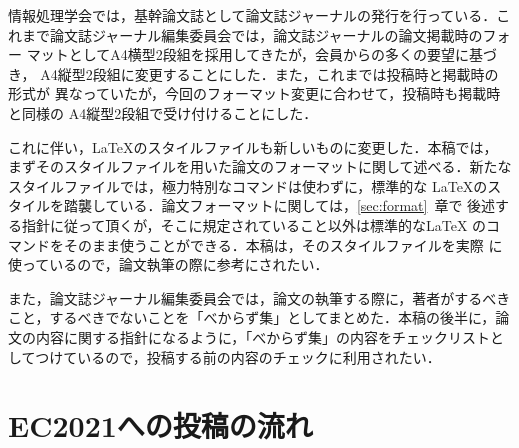 \documentclass[submit,techreq,noauthor]{ec2021}
\begin{document}
情報処理学会では，基幹論文誌として論文誌ジャーナルの発行を行っている．こ
れまで論文誌ジャーナル編集委員会では，論文誌ジャーナルの論文掲載時のフォー
マットとしてA4横型2段組を採用してきたが，会員からの多くの要望に基づき，
A4縦型2段組に変更することにした．また，これまでは投稿時と掲載時の形式が
異なっていたが，今回のフォーマット変更に合わせて，投稿時も掲載時と同様の
A4縦型2段組で受け付けることにした．


これに伴い，\LaTeX のスタイルファイルも新しいものに変更した．本稿では，
まずそのスタイルファイルを用いた論文のフォーマットに関して述べる．新たな
スタイルファイルでは，極力特別なコマンドは使わずに，標準的な \LaTeX のス
タイルを踏襲している．論文フォーマットに関しては，\ref{sec:format}~章で
後述する指針に従って頂くが，そこに規定されていること以外は標準的な\LaTeX 
のコマンドをそのまま使うことができる．本稿は，そのスタイルファイルを実際
に使っているので，論文執筆の際に参考にされたい．



また，論文誌ジャーナル編集委員会では，論文の執筆する際に，著者がするべき
こと，するべきでないことを「べからず集」としてまとめた．本稿の後半に，論
文の内容に関する指針になるように，「べからず集」の内容をチェックリストと
してつけているので，投稿する前の内容のチェックに利用されたい．

\section{EC2021への投稿の流れ}

\end{document}
